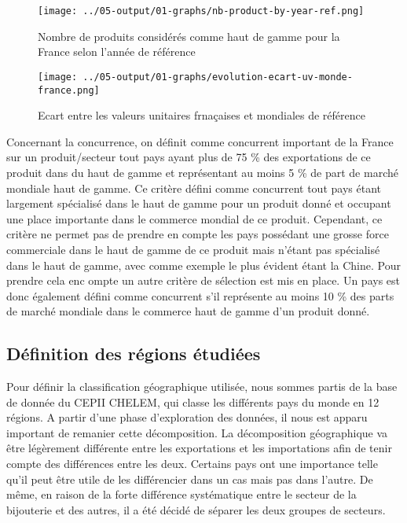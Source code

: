 \documentclass[french,10pt,a4paper]{article}
\begin{document}
\begin{figure}[!h]
  \centering
  \texttt{[image: ../05-output/01-graphs/nb-product-by-year-ref.png]}
  \caption{Nombre de produits considérés comme haut de gamme pour la France selon l'année de référence}
  \label{fig:nb-products-by-year-ref}
\end{figure}

\begin{figure}[!h]
  \centering
  \texttt{[image: ../05-output/01-graphs/evolution-ecart-uv-monde-france.png]}
  \caption{Ecart entre les valeurs unitaires frnaçaises et mondiales de référence}

\end{figure}


Concernant la concurrence, on définit comme concurrent important de la France sur un produit/secteur tout pays ayant plus de 75 \% des exportations de ce produit dans du haut de gamme et représentant au moins 5 \% de part de marché mondiale haut de gamme. Ce critère défini comme concurrent tout pays étant largement spécialisé dans le haut de gamme pour un produit donné et occupant une place importante dans le commerce mondial de ce produit. Cependant, ce critère ne permet pas de prendre en compte les pays possédant une grosse force commerciale dans le haut de gamme de ce produit mais n'étant pas spécialisé dans le haut de gamme, avec comme exemple le plus évident étant la Chine. Pour prendre cela enc ompte un autre critère de sélection est mis en place. Un pays est donc également défini comme concurrent s'il représente au moins 10 \% des parts de marché mondiale dans le commerce haut de gamme d'un produit donné.


\subsection{Définition des régions étudiées}

Pour définir la classification géographique utilisée, nous sommes partis de la base de donnée du CEPII CHELEM, qui classe les différents pays du monde en 12 régions. A partir d'une phase d'exploration des données, il nous est apparu important de remanier cette décomposition. La décomposition géographique va être légèrement différente entre les exportations et les importations afin de tenir compte des différences entre les deux. Certains pays ont une importance telle qu'il peut être utile de les différencier dans un cas mais pas dans l'autre. De même, en raison de la forte différence systématique entre le secteur de la bijouterie et des autres, il a été décidé de séparer les deux groupes de secteurs.
\end{document}
